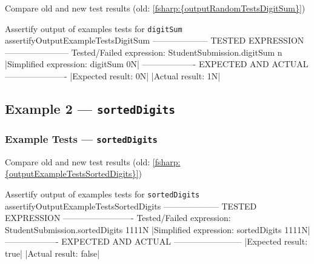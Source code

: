 \begin{todolist}
    \item Compare old and new test results (old: \ref{fsharp:{outputRandomTestsDigitSum}})
\end{todolist}


\begin{fsharpoutput}%
{Assertify output of examples tests for \texttt{digitSum}}%
{assertifyOutputExampleTestsDigitSum}
-------------------- TESTED EXPRESSION -----------------------
Tested/Failed expression:   StudentSubmission.digitSum n
|{\color{blue}Simplified expression:      digitSum 0N}|
------------------- EXPECTED AND ACTUAL ----------------------
|{\color{green!70!black}Expected result:            0N}|
|{\color{red}Actual result:              1N}|
\end{fsharpoutput}


\newpage %
\subsection{Example 2 --- \texttt{sortedDigits}} %


\todo{}


\subsubsection{Example Tests --- \texttt{sortedDigits}} %


\begin{todolist}
    \item Compare old and new test results (old: \ref{fsharp:{outputExampleTestsSortedDigits}})
\end{todolist}


\begin{fsharpoutput}%
{Assertify output of examples tests for \texttt{sortedDigits}}%
{assertifyOutputExampleTestsSortedDigits}
-------------------- TESTED EXPRESSION -------------------------
Tested/Failed expression:   StudentSubmission.sortedDigits 1111N
|{\color{blue}Simplified expression:      sortedDigits 1111N}|
------------------- EXPECTED AND ACTUAL ------------------------
|{\color{green!70!black}Expected result:            true}|
|{\color{red}Actual result:              false}|
\end{fsharpoutput}



